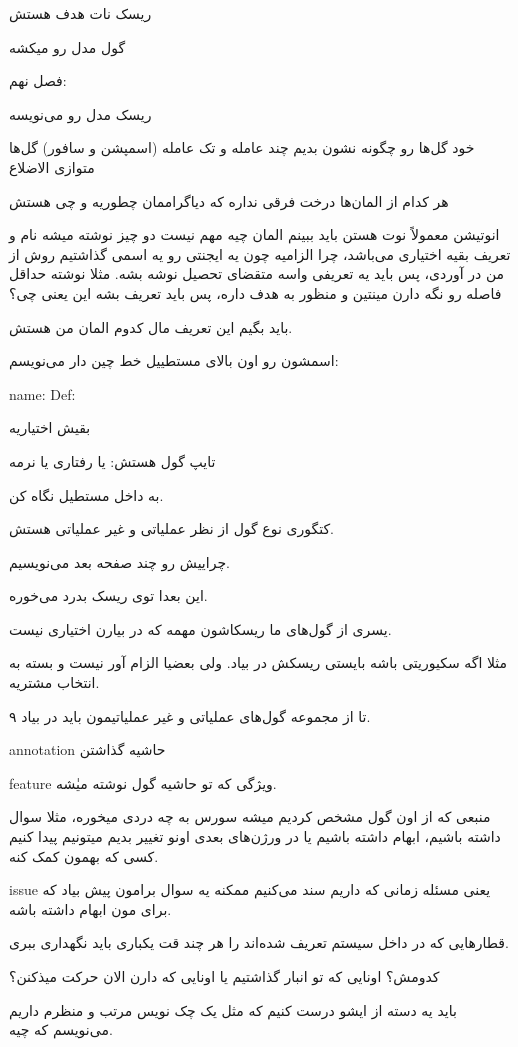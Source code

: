ریسک نات هدف هستش

گول مدل رو میکشه

فصل نهم:

ریسک مدل رو می‌نویسه

خود گل‌ها رو چگونه نشون بدیم
چند عامله و تک عامله (اسمپشن و سافور) گل‌ها متوازی الاضلاع

هر کدام از المان‌ها درخت فرقی نداره که دیاگراممان چطوریه و چی هستش

انوتیشن معمولاً نوت هستن باید ببینم المان چیه مهم نیست دو چیز نوشته میشه نام و
تعریف بقیه اختیاری می‌باشد، چرا الزامیه چون یه ایجنتی رو یه اسمی گذاشتیم روش از
من در آوردی، پس باید یه تعریفی واسه متقضای تحصیل نوشه بشه. مثلا نوشته حداقل
فاصله رو نگه دارن مینتین و منظور به هدف داره، پس باید تعریف بشه این یعنی چی؟

باید بگیم این تعریف مال کدوم المان من هستش.

اسمشون رو اون بالای مستطییل خط چین دار می‌نویسم:

name:
Def:

بقیش اختیاریه

تایپ گول هستش: یا رفتاری یا نرمه

به داخل مستطیل نگاه کن.

کتگوری نوع گول از نظر عملیاتی و غیر عملیاتی هستش.

چراییش رو چند صفحه بعد می‌نویسیم.

این بعدا توی ریسک بدرد می‌خوره.

یسری از گول‌های ما ریسکاشون مهمه که در بیارن اختیاری نیست.

مثلا اگه سکیوریتی باشه بایستی ریسکش در بیاد. ولی بعضیا الزام آور نیست و بسته به
انتخاب مشتریه.

۹ تا از مجموعه گول‌های عملیاتی و غیر عملیاتیمون باید در بیاد.

annotation حاشیه گذاشتن

feature ويژگی که تو حاشیه گول نوشته میٰشه.

منبعی که از اون گول مشخص کردیم میشه سورس
به چه دردی میخوره، مثلا سوال داشته باشیم، ابهام داشته باشیم یا در ورژن‌های بعدی
اونو تغییر بدیم میتونیم پیدا کنیم کسی که بهمون کمک کنه.

issue یعنی مسئله زمانی که داریم سند می‌کنیم ممکنه یه سوال برامون پیش بیاد که
برای مون ابهام داشته باشه.

قطار‌هایی که در داخل سیستم تعریف شده‌اند را هر چند قت یکباری باید نگهداری ببری.

کدومش؟ اونایی که تو انبار گذاشتیم یا اونایی که دارن الان حرکت میذکنن؟

باید یه دسته از ایشو درست کنیم که مثل یک چک نویس مرتب و منظرم داریم می‌نویسم که
چیه.

